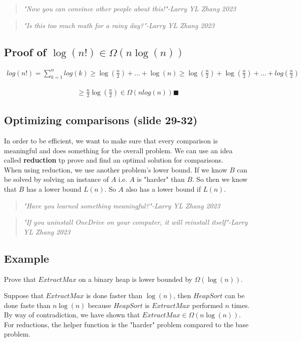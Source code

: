 \documentclass[12pt]{article}
\begin{document}
\begin{quote}
    \textit{"Now you can convince other people about this!"-Larry YL Zhang 2023}
\end{quote}

\begin{quote}
    \textit{"Is this too much math for a rainy day?"-Larry YL Zhang 2023}
\end{quote}

\subsection*{Proof of $\log(n!)\in \Omega(n\log(n))$}

\begin{align*}
    log(n!)=\sum_{k=1}^{n}log(k)\geq \log(\frac{n}{2})+\ldots+\log(n)\geq\log(\frac{n}{2})+\log(\frac{n}{2})+\ldots+log(\frac{n}{2})
\end{align*}

\begin{align*}
    \geq\frac{n}{2}\log(\frac{n}{2})\in \Omega(nlog(n)) \blacksquare
\end{align*}

\subsection*{Optimizing comparisons (slide 29-32)}

In order to be efficient, we want to make sure that every comparison is meaningful and does something for the overall problem. We can use an idea called \textbf{reduction} tp prove and find an optimal solution for comparisons.\\

When using reduction, we use another problem's lower bound. If we know $B$ can be solved by solving an instance of $A$ i.e. $A$ is "harder" than $B$. So then we know that $B$ has a lower bound $L(n)$. So $A$ also has a lower bound if $L(n)$.

\begin{quote}
    \textit{"Have you learned something meaningful?"-Larry YL Zhang 2023}
\end{quote}

\begin{quote}
    \textit{"If you uninstall OneDrive on your computer, it will reinstall itself"-Larry YL Zhang 2023}
\end{quote}

\subsection*{Example}
Prove that $ExtractMax$ on a binary heap is lower bounded by $\Omega(\log(n))$.

Suppose that $ExtractMax$ is done faster than $\log(n)$, then $HeapSort$ can be done faste than $n\log(n)$ because $HeapSort$ is $ExtractMax$ performed $n$ times. By way of contradiction, we have shown that $ExtractMax\in \Omega(n\log(n))$.\\

For reductions, the helper function is the "harder" problem compared to the base problem.
\end{document}
